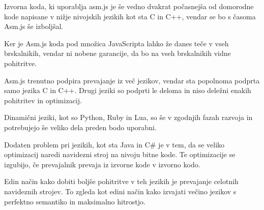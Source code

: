 Izvorna koda, ki uporablja asm.js je še vedno dvakrat počasnejša od domorodne kode napisane v nižje nivojskih jezikih kot sta C in C++, vendar se bo s časoma Asm.js še izboljšal.

Ker je Asm.js koda pod množica JavaScripta lahko že danes teče v vseh brskalnikih, vendar ni nobene garancije, da bo na vseh brskalnikih vidne pohitritve.  

Asm.js trenutno podpira prevajanje iz več jezikov, vendar sta popolnoma podprta samo jezika C in C++. Drugi jeziki so podprti le deloma in niso deležni enakih pohitritev in optimizacij.

Dinamični jeziki, kot so Python, Ruby in Lua, so še v zgodnjih fazah razvoja in potrebujejo še veliko dela preden bodo uporabni.

Dodaten problem pri jezikih, kot sta Java in C\# je v tem, da se veliko optimizacij naredi navidezni stroj na nivoju bitne kode. Te optimizacije se izgubijo, če prevajalnik prevaja iz izvorne kode v izvorno kodo.

Edin način kako dobiti boljše pohitritve v teh jezikih je prevajanje celotnih navideznih strojev. To zgleda kot edini način kako izvajati večino jezikov s perfektno semantiko in maksimalno hitrostjo.

